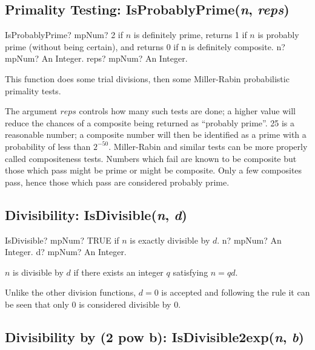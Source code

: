 \subsection{Primality Testing: IsProbablyPrime(\textit{n}, \textit{reps})}

\begin{mpFunctionsExtract}
	\mpFunctionTwo
	{IsProbablyPrime? mpNum? 2 if $n$ is definitely prime, returns 1 if $n$ is probably prime (without being certain), and returns 0 if n is definitely composite.}
	{n? mpNum? An Integer.}
	{reps? mpNum? An Integer.}
\end{mpFunctionsExtract}

\vspace{0.3cm}
This function does some trial divisions, then some Miller-Rabin probabilistic primality tests.

The argument $reps$ controls how many such tests are done; a higher value will reduce the chances of a composite being returned as “probably prime”. 25 is a reasonable number; a composite number will then be identified as a prime with a probability of less than $2^{-50}$. Miller-Rabin and similar tests can be more properly called compositeness tests. Numbers which fail are known to be composite but those which pass might be prime or might be composite. Only a few composites pass, hence those which pass are considered probably prime.




\subsection{Divisibility: IsDivisible(\textit{n}, \textit{d})}

\begin{mpFunctionsExtract}
	\mpFunctionTwo
	{IsDivisible? mpNum? TRUE if $n$ is exactly divisible by $d$.}
	{n? mpNum? An Integer.}
	{d? mpNum? An Integer.}
\end{mpFunctionsExtract}

\vspace{0.3cm}

$n$ is divisible by $d$ if there exists an integer $q$ satisfying $n = qd$. 

Unlike the other division functions, $d = 0$ is accepted and following the rule it can be seen that only 0 is considered divisible by 0.





\subsection{Divisibility by (2 pow b): IsDivisible2exp(\textit{n}, \textit{b})}

